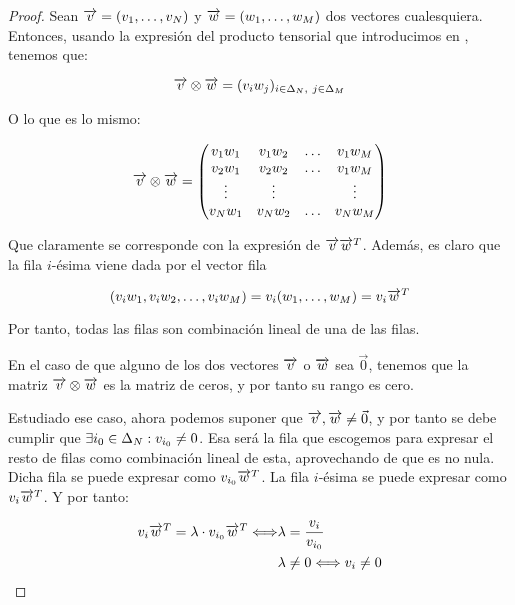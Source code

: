 \begin{proof}

Sean $\overrightarrow{v} = (v_1, \ldots, v_N)$ y $\overrightarrow{w} = (w_1, \ldots, w_M)$ dos vectores cualesquiera. Entonces, usando la expresión del producto tensorial que introducimos en , tenemos que:

\begin{equation}
    \overrightarrow{v} \otimes \overrightarrow{w} = (v_i w_j)_{i \in \Delta_{N},\ j \in \Delta_{M}}
\end{equation}

O lo que es lo mismo:

\begin{equation}
    \overrightarrow{v} \otimes \overrightarrow{w} = \begin{pmatrix}
        v_1 w_1 & v_1 w_2 & \ldots & v_1 w_M \\
        v_2 w_1 & v_2 w_2 & \ldots & v_1 w_M \\
        \vdots  & \vdots & & \vdots \\
        v_N w_1 & v_N w_2 & \ldots & v_N w_M \\
    \end{pmatrix}
\end{equation}

Que claramente se corresponde con la expresión de $\overrightarrow{v} \overrightarrow{w}^T$. Además, es claro que la fila $i$-ésima viene dada por el vector fila

$$(v_i w_1, v_i w_2, \ldots, v_i w_M) = v_i (w_1, \ldots, w_M) = v_i \overrightarrow{w}^T$$

Por tanto, todas las filas son combinación lineal de una de las filas.

En el caso de que alguno de los dos vectores $\overrightarrow{v}$ o $\overrightarrow{w}$ sea $\vec{0}$, tenemos que la matriz $\overrightarrow{v} \otimes \overrightarrow{w}$ es la matriz de ceros, y por tanto su rango es cero.

Estudiado ese caso, ahora podemos suponer que $\overrightarrow{v}, \overrightarrow{w} \neq \vec{0}$, y por tanto se debe cumplir que $\exists i_0 \in \Delta_{N}: v_{i_0} \neq 0$. Esa será la fila que escogemos para expresar el resto de filas como combinación lineal de esta, aprovechando de que es no nula. Dicha fila se puede expresar como $v_{i_0} \overrightarrow{w}^T$. La fila $i$-ésima se puede expresar como $v_i \overrightarrow{w}^T$. Y por tanto:

\begin{equation}
\begin{split}
    v_i \overrightarrow{w}^T = \lambda \cdot v_{i_0} \overrightarrow{w}^T \Longleftrightarrow & \lambda = \frac{v_i}{v_{i_0}} \\
                                                               & \lambda \neq 0 \Longleftrightarrow v_i \neq 0
\end{split}
\end{equation}


\end{proof}
